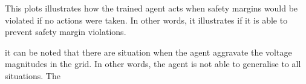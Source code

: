 \documentclass[class=book, crop=false]{standalone}
\begin{document}
 This plots illustrates how the trained agent acts when safety margins would be violated if no actions were taken. In other words, it illustrates if it is able to prevent safety margin violations. 

it can be noted that there are situation when the agent aggravate the voltage magnitudes in the grid. In other words, the agent is not able to generalise to all situations. The 
\end{document}
